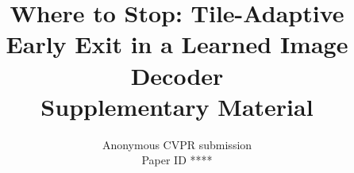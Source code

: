 \documentclass[10pt,twocolumn,letterpaper]{article}
\title{Where to Stop: Tile-Adaptive Early Exit in a Learned Image Decoder\\
       \large Supplementary Material}
\author{Anonymous CVPR submission\\ Paper ID ****}
\begin{document}
\maketitle
\appendix















{\small


}
\end{document}
